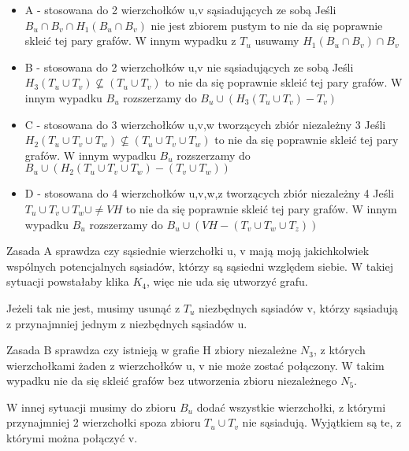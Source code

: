 \documentclass[11pt]{article}
\begin{document}
\begin{itemize}
  \item   A - stosowana do 2 wierzchołków u,v sąsiadujących ze sobą \linebreak
  Jeśli $B_u \cap B_v \cap H_1(B_u \cap B_v)$ nie jest zbiorem pustym to nie da się 
  poprawnie skleić tej pary grafów. \linebreak
  W innym wypadku z $T_u$ usuwamy $H_1(B_u \cap B_v) \cap B_v $  
  \item   B - stosowana do 2 wierzchołków u,v nie sąsiadujących ze sobą \linebreak
  Jeśli $H_3(T_u \cup T_v) \not\subseteq (T_u \cup T_v)$ to nie da się poprawnie skleić tej 
  pary grafów. \linebreak
  W innym wypadku $B_u$ rozszerzamy do $B_u \cup (H_3(T_u \cup T_v) - T_v)$
  \item   C - stosowana do 3 wierzchołków u,v,w tworzących zbiór niezależny 3 \linebreak
  Jeśli $H_2(T_u \cup T_v \cup T_w) \not\subseteq (T_u \cup T_v \cup T_w)$ 
  to nie da się poprawnie skleić tej pary grafów. \linebreak
  W innym wypadku $B_u$ rozszerzamy do $B_u \cup (H_2(T_u \cup T_v \cup T_w) - (T_v \cup T_w))$
  \item   D - stosowana do 4 wierzchołków u,v,w,z tworzących zbiór niezależny 4 \linebreak
  Jeśli $T_u \cup T_v \cup T_w \cup \neq VH $ to nie da się poprawnie skleić tej pary grafów.
  W innym wypadku $B_u$ rozszerzamy do $B_u \cup (VH - (T_v \cup T_w \cup T_z))$
\end{itemize}

Zasada A sprawdza czy sąsiednie wierzchołki u, v mają moją jakichkolwiek wspólnych potencjalnych sąsiadów, którzy są sąsiedni względem siebie.
W takiej sytuacji powstałaby klika $K_4$, więc nie uda się utworzyć grafu. 

Jeżeli tak nie jest, musimy usunąć z $T_u$ niezbędnych sąsiadów v, 
którzy sąsiadują z przynajmniej jednym z niezbędnych sąsiadów u. \linebreak

Zasada B sprawdza czy istnieją w grafie H zbiory niezależne $N_3$, z których wierzchołkami żaden z wierzchołków u, v 
nie może zostać połączony. W takim wypadku nie da się skleić grafów bez utworzenia zbioru niezależnego $N_5$. 

W innej sytuacji musimy do zbioru $B_u$ dodać wszystkie wierzchołki, 
z którymi przynajmniej 2 wierzchołki spoza zbioru $T_u \cup T_v$ nie sąsiadują. Wyjątkiem są te, z którymi można połączyć v.  \linebreak 
\end{document}
